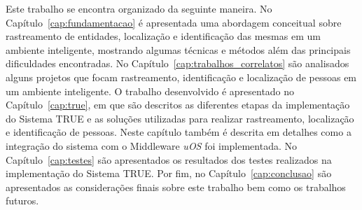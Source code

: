 Este trabalho se encontra organizado da seguinte maneira. No Capítulo~\ref{cap:fundamentacao} é apresentada uma abordagem conceitual sobre rastreamento de entidades, localização e identificação das mesmas em um ambiente inteligente, mostrando algumas técnicas e métodos além das principais dificuldades encontradas. No Capítulo~\ref{cap:trabalhos_correlatos} são analisados alguns projetos que focam rastreamento, identificação e localização de pessoas em um ambiente inteligente. O trabalho desenvolvido é apresentado no Capítulo~\ref{cap:true}, em que são descritos as diferentes etapas da implementação do Sistema TRUE e as soluções utilizadas para realizar rastreamento, localização e identificação de pessoas. Neste capítulo também é descrita em detalhes como a integração do sistema com o Middleware \textit{uOS} foi implementada. No Capítulo~\ref{cap:testes} são apresentados os resultados dos testes realizados na implementação do Sistema TRUE. Por fim, no Capítulo~\ref{cap:conclusao} são apresentados as considerações finais sobre este trabalho bem como os trabalhos futuros.



